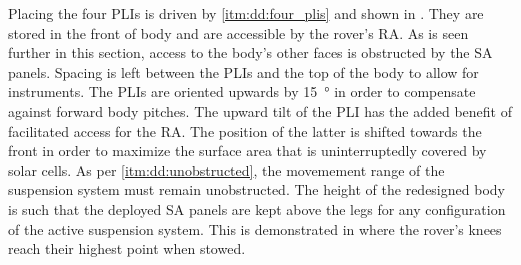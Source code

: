 Placing the four \acp{PLI} is driven by \ref{itm:dd:four_plis} and shown in . They are stored in the front of body and are accessible by the rover's \ac{RA}. As is seen further in this section, access to the body's other faces is obstructed by the \ac{SA} panels. Spacing is left between the \acp{PLI} and the top of the body to allow for instruments. The \acp{PLI} are oriented upwards by \SI{15}{\degree} in order to compensate against forward body pitches. The upward tilt of the \ac{PLI} has the added benefit of facilitated access for the \ac{RA}. The position of the latter is shifted towards the front in order to maximize the surface area that is uninterruptedly covered by solar cells. As per \ref{itm:dd:unobstructed}, the movemement range of the suspension system must remain unobstructed. The height of the redesigned body is such that the deployed \ac{SA} panels are kept above the legs for any configuration of the active suspension system. This is demonstrated in  where the rover's knees reach their highest point when stowed.

